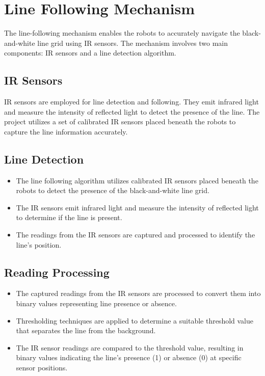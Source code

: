 \documentclass[a4paper,12pt,oneside]{book}
\begin{document}
\newpage
\section{Line Following Mechanism}
The line-following mechanism enables the robots to accurately navigate the black-and-white line grid using IR sensors. The mechanism involves two main components: IR sensors and a line detection algorithm.

\subsection{IR Sensors}
IR sensors are employed for line detection and following. They emit infrared light and measure the intensity of reflected light to detect the presence of the line. The project utilizes a set of calibrated IR sensors placed beneath the robots to capture the line information accurately.


\subsection{Line Detection}
\begin{itemize}
  \item The line following algorithm utilizes calibrated IR sensors placed beneath the robots to detect the presence of the black-and-white line grid.
  \item The IR sensors emit infrared light and measure the intensity of reflected light to determine if the line is present.
  \item The readings from the IR sensors are captured and processed to identify the line's position.
\end{itemize}

\subsection{Reading Processing}
\begin{itemize}
  \item The captured readings from the IR sensors are processed to convert them into binary values representing line presence or absence.
  \item Thresholding techniques are applied to determine a suitable threshold value that separates the line from the background.
  \item The IR sensor readings are compared to the threshold value, resulting in binary values indicating the line's presence (1) or absence (0) at specific sensor positions.
\end{itemize}
\end{document}
